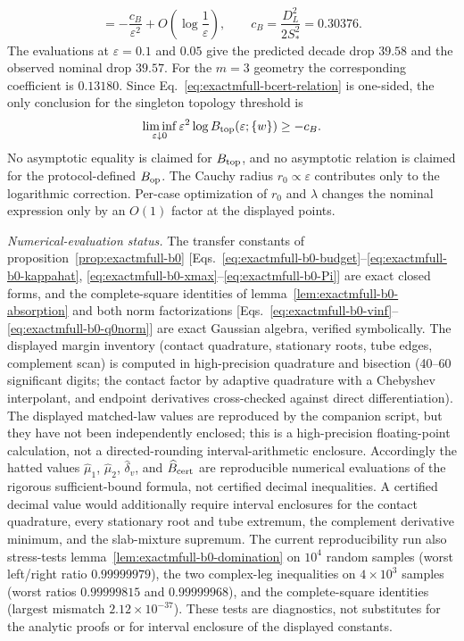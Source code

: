 \begin{remark}
\begin{equation}
 =-\frac{c_B}{\varepsilon^2}
  +O\!\left(\log\frac1\varepsilon\right),
 \qquad
 c_B=\frac{D_L^2}{2S_*^2}=0.30376.
 \label{eq:exactmfull-b0-rate}
\end{equation}
The evaluations at \(\varepsilon=0.1\) and \(0.05\) give the predicted
decade drop \(39.58\) and the observed nominal drop \(39.57\).  For the
\(m=3\) geometry the corresponding coefficient is \(0.13180\).  Since
Eq.~\eqref{eq:exactmfull-bcert-relation} is one-sided, the only conclusion
for the singleton topology threshold is
\begin{equation}
 \liminf_{\varepsilon\downarrow0}
 \varepsilon^2\log B_{\rm top}(\varepsilon;\{w\})\ge-c_B.
\end{equation}
No asymptotic equality is claimed for \(B_{\rm top}\), and no asymptotic
relation is claimed for the protocol-defined \(B_{\rm op}\).  The Cauchy
radius \(r_0\propto\varepsilon\) contributes only to the logarithmic
correction.  Per-case optimization of \(r_0\) and \(\lambda\) changes the
nominal expression only by an \(O(1)\) factor at the displayed points.

\emph{Numerical-evaluation status.}  The transfer constants of
proposition~\ref{prop:exactmfull-b0}
[Eqs.~\eqref{eq:exactmfull-b0-budget}--\eqref{eq:exactmfull-b0-kappahat},
\eqref{eq:exactmfull-b0-xmax}--\eqref{eq:exactmfull-b0-Pi}] are exact
closed forms, and the complete-square identities of
lemma~\ref{lem:exactmfull-b0-absorption} and both norm factorizations
[Eqs.~\eqref{eq:exactmfull-b0-vinf}--\eqref{eq:exactmfull-b0-q0norm}] are
exact Gaussian algebra, verified symbolically.  The displayed margin inventory
(contact quadrature, stationary roots, tube edges, complement scan) is
computed in high-precision quadrature and bisection (40--60 significant
digits; the contact factor by adaptive quadrature with a Chebyshev
interpolant, and endpoint derivatives cross-checked against direct
differentiation).  The displayed matched-law values are reproduced by the
companion script, but they have not been independently enclosed; this is a
high-precision floating-point calculation, not a directed-rounding
interval-arithmetic enclosure.  Accordingly the hatted values
\(\widehat\mu_1\), \(\widehat\mu_2\), \(\widehat\delta_v\), and
\(\widehat B_{\rm cert}\) are reproducible numerical evaluations of the
rigorous sufficient-bound formula, not certified decimal inequalities.  A
certified decimal value would additionally require interval enclosures for
the contact quadrature, every stationary root and tube extremum, the
complement derivative minimum, and the slab-mixture supremum.
The current reproducibility run also stress-tests
lemma~\ref{lem:exactmfull-b0-domination} on \(10^4\) random samples
(worst left/right ratio \(0.99999979\)), the two complex-leg inequalities
on \(4\times10^3\) samples (worst ratios \(0.99999815\) and
\(0.99999968\)), and the complete-square identities (largest mismatch
\(2.12\times10^{-37}\)).  These tests are diagnostics, not substitutes for
the analytic proofs or for interval enclosure of the displayed constants.
\end{remark}
